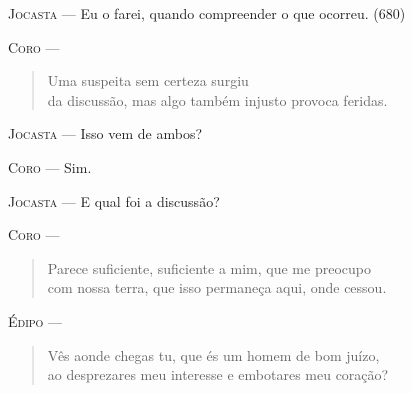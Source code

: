 \textsc{Jocasta} --- Eu o farei, quando compreender o que ocorreu. (680)

\textsc{Coro} --- \begin{verse}Uma suspeita sem certeza surgiu\\
da discussão, mas algo também injusto provoca feridas.
\end{verse}

\textsc{Jocasta} --- Isso vem de ambos?

\textsc{Coro} --- Sim.

\textsc{Jocasta} --- E qual foi a discussão?

\textsc{Coro} --- \begin{verse}Parece suficiente, suficiente a mim, que me preocupo\\
com nossa terra, que isso permaneça aqui, onde cessou.
\end{verse}

\textsc{Édipo} --- \begin{verse}Vês aonde chegas tu, que és um homem de bom juízo,\\
ao desprezares meu interesse e embotares meu coração?
\end{verse}

